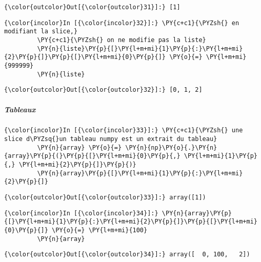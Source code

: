 \begin{Verbatim}[commandchars=\\\{\},frame=single,framerule=0.3mm,rulecolor=\color{cellframecolor}]
{\color{outcolor}Out[{\color{outcolor}31}]:} [1]
\end{Verbatim}
            
    \begin{Verbatim}[commandchars=\\\{\},frame=single,framerule=0.3mm,rulecolor=\color{cellframecolor}]
{\color{incolor}In [{\color{incolor}32}]:} \PY{c+c1}{\PYZsh{} en modifiant la slice,}
         \PY{c+c1}{\PYZsh{} on ne modifie pas la liste}
         \PY{n}{liste}\PY{p}{[}\PY{l+m+mi}{1}\PY{p}{:}\PY{l+m+mi}{2}\PY{p}{]}\PY{p}{[}\PY{l+m+mi}{0}\PY{p}{]} \PY{o}{=} \PY{l+m+mi}{999999}
         \PY{n}{liste}
\end{Verbatim}


\begin{Verbatim}[commandchars=\\\{\},frame=single,framerule=0.3mm,rulecolor=\color{cellframecolor}]
{\color{outcolor}Out[{\color{outcolor}32}]:} [0, 1, 2]
\end{Verbatim}
            
    \hypertarget{tableaux}{%
\subparagraph{Tableaux}\label{tableaux}}

    \begin{Verbatim}[commandchars=\\\{\},frame=single,framerule=0.3mm,rulecolor=\color{cellframecolor}]
{\color{incolor}In [{\color{incolor}33}]:} \PY{c+c1}{\PYZsh{} une slice d\PYZsq{}un tableau numpy est un extrait du tableau}
         \PY{n}{array} \PY{o}{=} \PY{n}{np}\PY{o}{.}\PY{n}{array}\PY{p}{(}\PY{p}{[}\PY{l+m+mi}{0}\PY{p}{,} \PY{l+m+mi}{1}\PY{p}{,} \PY{l+m+mi}{2}\PY{p}{]}\PY{p}{)}
         \PY{n}{array}\PY{p}{[}\PY{l+m+mi}{1}\PY{p}{:}\PY{l+m+mi}{2}\PY{p}{]}
\end{Verbatim}


\begin{Verbatim}[commandchars=\\\{\},frame=single,framerule=0.3mm,rulecolor=\color{cellframecolor}]
{\color{outcolor}Out[{\color{outcolor}33}]:} array([1])
\end{Verbatim}
            
    \begin{Verbatim}[commandchars=\\\{\},frame=single,framerule=0.3mm,rulecolor=\color{cellframecolor}]
{\color{incolor}In [{\color{incolor}34}]:} \PY{n}{array}\PY{p}{[}\PY{l+m+mi}{1}\PY{p}{:}\PY{l+m+mi}{2}\PY{p}{]}\PY{p}{[}\PY{l+m+mi}{0}\PY{p}{]} \PY{o}{=} \PY{l+m+mi}{100}
         \PY{n}{array}
\end{Verbatim}


\begin{Verbatim}[commandchars=\\\{\},frame=single,framerule=0.3mm,rulecolor=\color{cellframecolor}]
{\color{outcolor}Out[{\color{outcolor}34}]:} array([  0, 100,   2])
\end{Verbatim}
            

    
    
    
